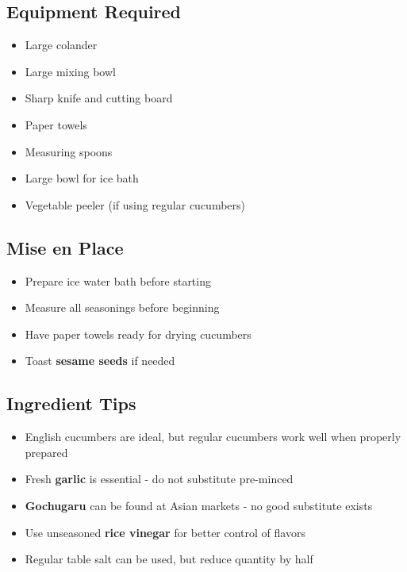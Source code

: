 \documentclass[11pt,letterpaper]{article}
\begin{document}
{\small
\setlength{\columnsep}{20pt}
\setlength{\multicolsep}{6pt}
\begin{multicols}{2}
\setlength{\parindent}{0pt}
\setlength{\parskip}{4pt}

\subsection*{Equipment Required}
\begin{itemize}
    \item Large colander
    \item Large mixing bowl
    \item Sharp knife and cutting board
    \item Paper towels
    \item Measuring spoons
    \item Large bowl for ice bath
    \item Vegetable peeler (if using regular cucumbers)
\end{itemize}

\subsection*{Mise en Place}
\begin{itemize}
    \item Prepare ice water bath before starting
    \item Measure all seasonings before beginning
    \item Have paper towels ready for drying cucumbers
    \item Toast \textbf{sesame seeds} if needed
\end{itemize}

\subsection*{Ingredient Tips}
\begin{itemize}
    \item English cucumbers are ideal, but regular cucumbers work well when properly prepared
    \item Fresh \textbf{garlic} is essential - do not substitute pre-minced
    \item \textbf{Gochugaru} can be found at Asian markets - no good substitute exists
    \item Use unseasoned \textbf{rice vinegar} for better control of flavors
    \item Regular table salt can be used, but reduce quantity by half
\end{itemize}


\end{multicols}}
\end{document}

